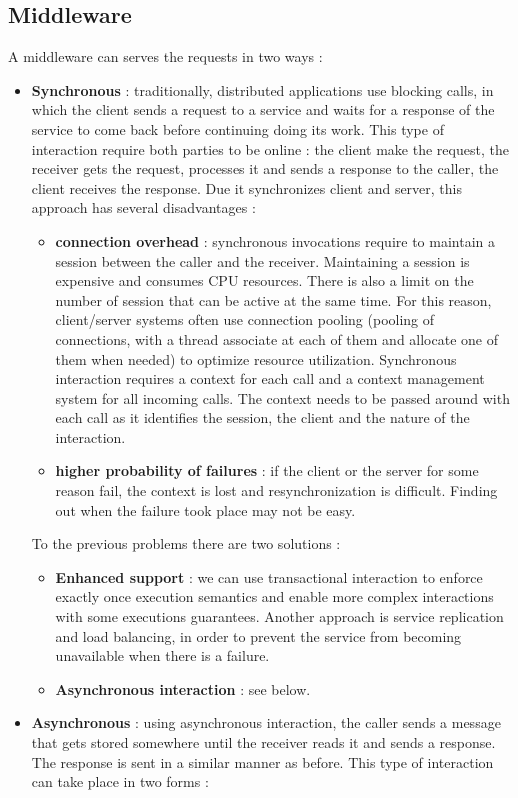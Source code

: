 \documentclass[11pt]{article}
\begin{document}
\subsection{Middleware}
A middleware can serves the requests in two ways :
\begin{itemize}
\item \textbf{Synchronous} : traditionally, distributed applications use blocking calls, in which the client sends a request to a service and waits for a response of the service to come back before continuing doing its work. This type of interaction require both parties to be online : the client make the request, the receiver gets the request, processes it and sends a response to the caller, the client receives the response. Due it synchronizes client and server, this approach has several disadvantages : 
\begin{itemize}
\item \textbf{connection overhead} : synchronous invocations require to maintain a session between the caller and the receiver. Maintaining a session is expensive and consumes CPU resources. There is also a limit on the number of session that can be active at the same time. For this reason, client/server systems often use connection pooling (pooling of connections, with a thread associate at each of them and allocate one of them when needed) to optimize resource utilization. Synchronous interaction requires a context for each call and a context management system for all incoming calls. The context needs to be passed around with each call as it identifies the session, the client and the nature of the interaction.
\item \textbf{higher probability of failures} : if the client or the server for some reason fail, the context is lost and resynchronization is difficult. Finding out when the failure took place may not be easy.
\end{itemize}
To the previous problems there are two solutions :
\begin{itemize}
\item \textbf{Enhanced support} : we can use transactional interaction to enforce exactly once execution semantics and enable more complex interactions with some executions guarantees. Another approach is service replication and load balancing, in order to prevent the service from becoming unavailable when there is a failure.
\item \textbf{Asynchronous interaction} : see below.
\end{itemize}
\item \textbf{Asynchronous} : using asynchronous interaction, the caller sends a message that gets stored somewhere until the receiver reads it and sends a response. The response is sent in a similar manner as before. This type of interaction can take place in two forms :

\end{itemize}
\end{document}

